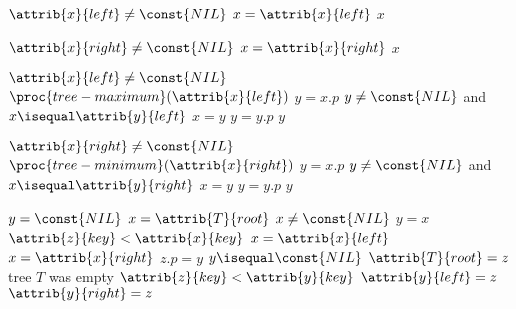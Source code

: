 \documentclass[12pt]{article}
\begin{document}
\begin{codebox}
\li \While $\attrib{x}{left} \neq \const{NIL}$
    \Do
    \li     $x = \attrib{x}{left}$
    \End
\li \Return $x$
\end{codebox}

\begin{codebox}
\li \While $\attrib{x}{right} \neq \const{NIL}$
    \Do
    \li     $x = \attrib{x}{right}$
    \End
\li \Return $x$
\end{codebox}

\begin{codebox}
\li \If $\attrib{x}{left} \neq \const{NIL}$
\li \Then
        \Return $\proc{tree-maximum}(\attrib{x}{left})$
    \End
\li $y = x.p$
\li \While $y \neq \const{NIL}$ and $x \isequal \attrib{y}{left}$
    \Do
        \li $x = y$ 
        \li $y = y.p$
    \End
\li \Return $y$
\end{codebox}

\begin{codebox}
\li \If $\attrib{x}{right} \neq \const{NIL}$
\li \Then
        \Return $\proc{tree-minimum}(\attrib{x}{right})$
    \End
\li $y = x.p$
\li \While $y \neq \const{NIL}$ and $x \isequal \attrib{y}{right}$
    \Do
        \li $x = y$ 
        \li $y = y.p$
    \End
\li \Return $y$
\end{codebox}

\begin{codebox}
\li $y = \const{NIL}$
\li $x = \attrib{T}{root}$
\li \While $x \neq \const{NIL}$
    \Do
    \li     $y = x$
        \li \If $\attrib{z}{key} < \attrib{x}{key}$
        \li \Then
                $x = \attrib{x}{left}$
        \li \Else
        \li     $x = \attrib{x}{right}$
            \End
    \End
\li $z.p = y$
\li \If $y \isequal \const{NIL}$
\li \Then
        $\attrib{T}{root} = z$ \Comment tree $T$ was empty
\li \ElseIf $\attrib{z}{key} < \attrib{y}{key}$
\li \Then
        $\attrib{y}{left} = z$
\li \Else
\li     $\attrib{y}{right} = z$
    \End
    
\end{codebox}
\end{document}

